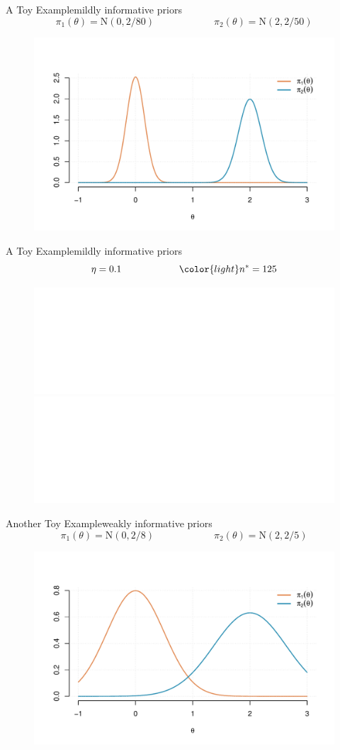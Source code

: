 \documentclass[9 pt]{beamer}
\begin{document}
\begin{frame}{A Toy Example}{mildly informative priors}
\[\pi_1(\theta) = \text{N}(0, 2/80) \qquad\qquad\qquad \pi_2(\theta) = \text{N}(2, 2/50)\]
\begin{figure}
    \centering
    \includegraphics[width = 1\textwidth]{images/plot_priors1.pdf}
\end{figure}
    
\end{frame}



\begin{frame}{A Toy Example}{mildly informative priors}
\[\eta = 0.1 \qquad\qquad\qquad {\color{light}n^*} = 125\]
\begin{figure}
    \centering
    \includegraphics<1>[width = 1\textwidth]{images/plot_PEC11.pdf}
    \includegraphics<2>[width = 1\textwidth]{images/plot_PEC12.pdf}
\end{figure}
    
\end{frame}




\begin{frame}{Another Toy Example}{weakly informative priors}
\[\pi_1(\theta) = \text{N}(0,2/8 ) \qquad\qquad\qquad \pi_2(\theta) = \text{N}(2,2/5 )\]
\begin{figure}
    \centering
    \includegraphics[width = 1\textwidth]{images/plot_priors2.pdf}
\end{figure}
    
\end{frame}
\end{document}
